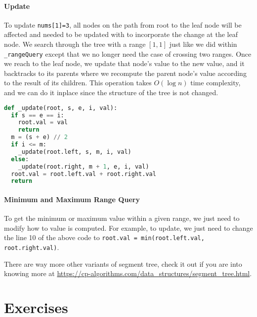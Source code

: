 \documentclass[main.tex]{subfiles}
\begin{document}
\paragraph{Update} To update \texttt{nums[1]=3}, all nodes on the path from root to the leaf node will be affected and needed to be updated with to incorporate the change at the leaf node. We search through the tree with a range $[1, 1]$ just like we did within \texttt{\_rangeQuery} except that we no longer need the case of crossing two ranges. Once we reach to the leaf node, we update that node's value to the new value, and it backtracks to its parents where we recompute the parent node's value according to the result of its children.   This operation takes $O(\log n)$ time complexity, and we can do it inplace since the structure of the tree is not changed. 
\begin{lstlisting}[language=Python]
def _update(root, s, e, i, val):
  if s == e == i:
    root.val = val
    return 
  m = (s + e) // 2
  if i <= m:
    _update(root.left, s, m, i, val)
  else:
    _update(root.right, m + 1, e, i, val)
  root.val = root.left.val + root.right.val
  return 
\end{lstlisting}

\paragraph{Minimum and Maximum Range Query} To get the minimum or maximum value within a given range, we just need to modify how to value is computed. For example, to update, we just need to change the line 10 of the above code to \texttt{root.val = min(root.left.val, root.right.val)}. 

There are way more other variants of segment tree, check it out if you are into knowing more at \url{https://cp-algorithms.com/data_structures/segment_tree.html}.





\section{Exercises}
\end{document}
